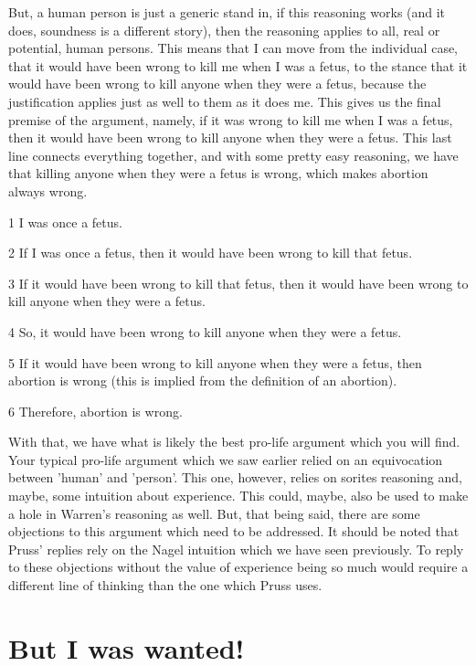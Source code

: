 But, a human person is just a generic stand in, if this reasoning works (and it does, soundness is a different story), then the reasoning applies to all, real or potential, human persons. This means that I can move from the individual case, that it would have been wrong to kill me when I was a fetus, to the stance that it would have been wrong to kill anyone when they were a fetus, because the justification applies just as well to them as it does me. This gives us the final premise of the argument, namely, if it was wrong to kill me when I was a fetus, then it would have been wrong to kill anyone when they were a fetus. This last line connects everything together, and with some pretty easy reasoning, we have that killing anyone when they were a fetus is wrong, which makes abortion always wrong. 
\begin{earg}
    \item[1] I was once a fetus.
    \item[2] If I was once a fetus, then it would have been wrong to kill that fetus.
    \item[3] If it would have been wrong to kill that fetus, then it would have been wrong to kill anyone when they were a fetus. 
    \item[4] So, it would have been wrong to kill anyone when they were a fetus.
    \item[5] If it would have been wrong to kill anyone when they were a fetus, then abortion is wrong (this is implied from the definition of an abortion). 
    \item[6] Therefore, abortion is wrong.
\end{earg}
With that, we have what is likely the best pro-life argument which you will find. Your typical pro-life argument which we saw earlier relied on an equivocation between 'human' and 'person'. This one, however, relies on sorites reasoning and, maybe, some intuition about experience. This could, maybe, also be used to make a hole in Warren's reasoning as well. But, that being said, there are some objections to this argument which need to be addressed. It should be noted that Pruss' replies rely on the Nagel intuition which we have seen previously. To reply to these objections without the value of experience being so much would require a different line of thinking than the one which Pruss uses. 
\section{But I was wanted!}

